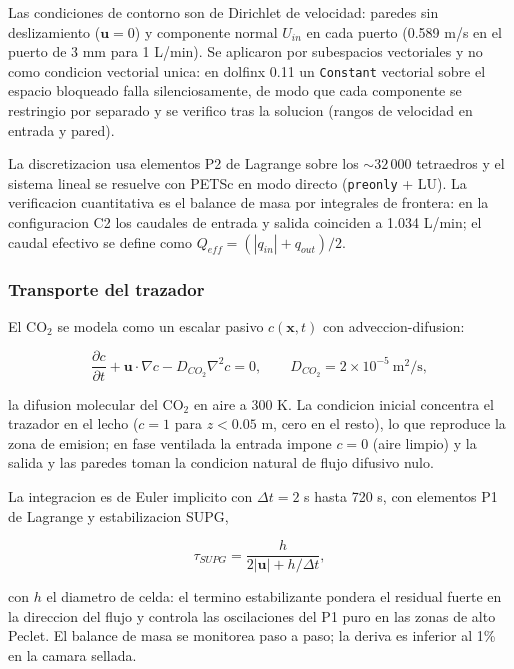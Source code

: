 Las condiciones de contorno son de Dirichlet de velocidad: paredes sin
deslizamiento ($\mathbf{u} = 0$) y componente normal $U_{in}$ en cada
puerto (0.589 m/s en el puerto de 3 mm para 1 L/min). Se aplicaron por
subespacios vectoriales y no como condicion vectorial unica: en dolfinx 0.11
un \texttt{Constant} vectorial sobre el espacio bloqueado falla
silenciosamente, de modo que cada componente se restringio por separado y
se verifico tras la solucion (rangos de velocidad en entrada y pared).

La discretizacion usa elementos P2 de Lagrange sobre los $\sim 32\,000$
tetraedros y el sistema lineal se resuelve con PETSc en modo directo
(\texttt{preonly} + LU). La verificacion cuantitativa es el balance de masa
por integrales de frontera: en la configuracion C2 los caudales de entrada
y salida coinciden a 1.034 L/min; el caudal efectivo se define como
$Q_{eff} = (|q_{in}| + q_{out})/2$.

\subsubsection{Transporte del trazador}

El CO$_2$ se modela como un escalar pasivo $c(\mathbf{x}, t)$ con
adveccion-difusion:

\begin{equation}
  \frac{\partial c}{\partial t} + \mathbf{u}\cdot\nabla c
  - D_{CO_2}\nabla^2 c = 0,
  \qquad D_{CO_2} = 2\times10^{-5}\ \mathrm{m}^2/\mathrm{s},
\end{equation}

la difusion molecular del CO$_2$ en aire a 300 K. La condicion inicial
concentra el trazador en el lecho ($c = 1$ para $z < 0.05$ m, cero en el
resto), lo que reproduce la zona de emision; en fase ventilada la entrada
impone $c = 0$ (aire limpio) y la salida y las paredes toman la condicion
natural de flujo difusivo nulo.

La integracion es de Euler implicito con $\Delta t = 2$ s hasta 720 s, con
elementos P1 de Lagrange y estabilizacion SUPG,

\begin{equation}
  \tau_{SUPG} = \frac{h}{2|\mathbf{u}| + h/\Delta t},
\end{equation}

con $h$ el diametro de celda: el termino estabilizante pondera el residual
fuerte en la direccion del flujo y controla las oscilaciones del P1 puro en
las zonas de alto Peclet. El balance de masa se monitorea paso a paso; la
deriva es inferior al 1\% en la camara sellada.

